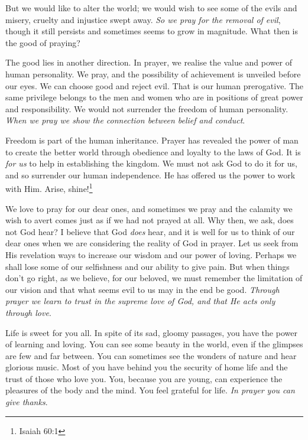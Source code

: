 \documentclass[14pt, article, extrafontsizes, twopage, a4paper]{memoir}
\begin{document}
But we would like to alter the world; we would wish to
see some of the evils and misery, cruelty and injustice
swept away. \textsl{So we pray for the removal of evil}, though it
still persists and sometimes seems to grow in magnitude.
What then is the good of praying?

The good lies in another direction. In prayer, we
realise the value and power of human personality. We pray,
and the possibility of achievement is unveiled before our
eyes. We can choose good and reject evil. That is our
human prerogative. The same privilege belongs to the men
and women who are in positions of great power and responsibility.
We would not surrender the freedom of human
personality. \textsl{When we pray we show the connection between
belief and conduct}.

Freedom is part of the human inheritance. Prayer has
revealed the power of man to create the better world
through obedience and loyalty to the laws of God. It is
\textsl{for us} to help in establishing the kingdom. We must not ask
God to do it for us, and so surrender our human independence.
He has offered us the power to work with Him.
Arise, shine!\footnote{Isaiah 60:1}

We love to pray for our dear ones, and sometimes we
pray and the calamity we wish to avert comes just as if we
had not prayed at all. Why then, we ask, does not God
hear? I believe that God \textsl{does} hear, and it is well for us
to think of our dear ones when we are considering the
reality of God in prayer. Let us seek from His revelation
ways to increase our wisdom and our power of loving.
Perhaps we shall lose some of our selfishness and our
ability to give pain. But when things don't go right, as
we believe, for our beloved, we must remember the limitation
of our vision and that what seems evil to us may in
the end be good. \textsl{Through prayer we learn to trust in the
supreme love of God, and that He acts only through love}.

Life is sweet for you all. In spite of its sad,
gloomy passages, you have the power of learning and loving.
You can see some beauty in the world, even if the glimpses
are few and far between. You can sometimes see the wonders
of nature and hear glorious music. Most of you have behind
you the security of home life and the trust of those who
love you. You, because you are young, can experience the
pleasures of the body and the mind. You feel grateful for
life. \textsl{In prayer you can give thanks}.
\end{document}
